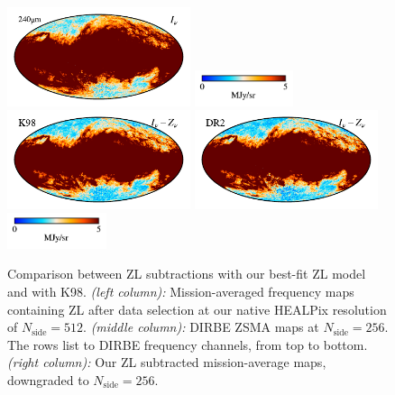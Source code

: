 \documentclass[twocolumn]{aa}
\begin{document}
\begin{figure}
    \includegraphics[height=2.90cm]{figs/compare_zsma/cosmoglobe_ma_10.pdf}%
    \includegraphics[width=2.90cm,angle=90]{figs/compare_zsma/cbar_tot_10.pdf}%
    \includegraphics[height=2.90cm]{figs/compare_zsma/dirbe_zsma_10.pdf}%
    \includegraphics[height=2.90cm]{figs/compare_zsma/cosmoglobe_zsma_10.pdf}%
    \includegraphics[width=2.90cm,angle=90]{figs/compare_zsma/cbar_10.pdf}%
      \\

    \caption{Comparison between ZL subtractions with our best-fit ZL model and with K98. 
    \textit{(left column):} Mission-averaged frequency maps containing ZL after data selection at our native HEALPix resolution 
    of $N_\mathrm{side} = 512$. \textit{(middle column):} DIRBE ZSMA maps
    at $N_\mathrm{side} = 256$. The rows list to DIRBE frequency channels, from top to 
    bottom. \textit{(right column):} Our ZL subtracted mission-average 
    maps, downgraded to $N_\mathrm{side} = 256$. 
    }    
    \label{fig:dr2-zsma-compare2}
\end{figure}
\end{document}
